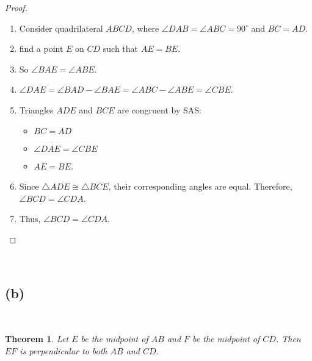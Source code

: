 \documentclass{article}
\newtheorem{theorem}{Theorem}
\begin{document}
\begin{proof}

~

\begin{enumerate}
    \item Consider quadrilateral \( ABCD \), where \( \angle DAB = \angle ABC = 90^\circ \) and \( BC = AD \).

    \item find a point \(E\) on \(CD\) such that \(AE=BE\).

    \item So \(\angle BAE=\angle ABE\).

    \item \(\angle DAE=\angle BAD-\angle BAE=\angle ABC-\angle ABE=\angle CBE\).

    \item Triangles \( ADE \) and \( BCE \) are congruent by SAS:
       \begin{itemize}
       \item \( BC = AD \)
       \item \(\angle DAE=\angle CBE\)
       \item \( AE=BE\).
       \end{itemize}
    \item Since \( \triangle ADE \cong \triangle BCE \), their corresponding angles are equal. Therefore, \( \angle BCD = \angle CDA \).

    \item Thus, \( \angle BCD = \angle CDA \).
\end{enumerate}
 
\end{proof}

~

\subsection*{(b)}

~

\begin{theorem}
Let \( E \) be the midpoint of \( AB \) and \( F \) be the midpoint of \( CD \). Then \( EF \) is perpendicular to both \( AB \) and \( CD \).
\end{theorem}
\end{document}
